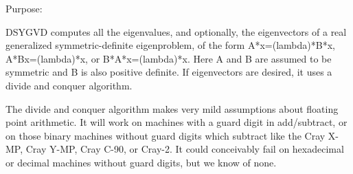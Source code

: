  \begin{DoxyParagraph}{Purpose\+: }
\begin{DoxyVerb} DSYGVD computes all the eigenvalues, and optionally, the eigenvectors
 of a real generalized symmetric-definite eigenproblem, of the form
 A*x=(lambda)*B*x,  A*Bx=(lambda)*x,  or B*A*x=(lambda)*x.  Here A and
 B are assumed to be symmetric and B is also positive definite.
 If eigenvectors are desired, it uses a divide and conquer algorithm.

 The divide and conquer algorithm makes very mild assumptions about
 floating point arithmetic. It will work on machines with a guard
 digit in add/subtract, or on those binary machines without guard
 digits which subtract like the Cray X-MP, Cray Y-MP, Cray C-90, or
 Cray-2. It could conceivably fail on hexadecimal or decimal machines
 without guard digits, but we know of none.\end{DoxyVerb}
 
\end{DoxyParagraph}

